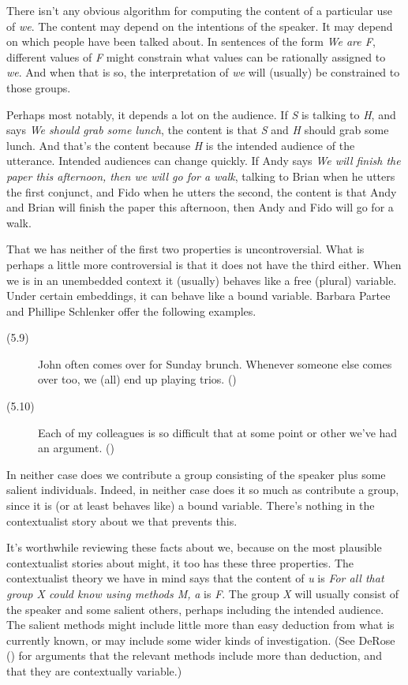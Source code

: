 \documentclass[
  10pt,
  letterpaper,
  DIV=11,
  numbers=noendperiod,
  twoside]{scrartcl}
\begin{document}
There isn't any obvious algorithm for computing the content of a
particular use of \emph{we}. The content may depend on the intentions of
the speaker. It may depend on which people have been talked about. In
sentences of the form \emph{We are F}, different values of \emph{F}
might constrain what values can be rationally assigned to \emph{we}. And
when that is so, the interpretation of \emph{we} will (usually) be
constrained to those groups.

Perhaps most notably, it depends a lot on the audience. If \emph{S} is
talking to \emph{H}, and says \emph{We should grab some lunch}, the
content is that \emph{S} and \emph{H} should grab some lunch. And that's
the content because \emph{H} is the intended audience of the utterance.
Intended audiences can change quickly. If Andy says \emph{We will finish
the paper this afternoon, then we will go for a walk}, talking to Brian
when he utters the first conjunct, and Fido when he utters the second,
the content is that Andy and Brian will finish the paper this afternoon,
then Andy and Fido will go for a walk.

That we has neither of the first two properties is uncontroversial. What
is perhaps a little more controversial is that it does not have the
third either. When we is in an unembedded context it (usually) behaves
like a free (plural) variable. Under certain embeddings, it can behave
like a bound variable. Barbara Partee and Phillipe Schlenker offer the
following examples.

\begin{description}
\item[(5.9)]
John often comes over for Sunday brunch. Whenever someone else comes
over too, we (all) end up playing trios.
()
\item[(5.10)]
Each of my colleagues is so difficult that at some point or other we've
had an argument. ()
\end{description}

In neither case does we contribute a group consisting of the speaker
plus some salient individuals. Indeed, in neither case does it so much
as contribute a group, since it is (or at least behaves like) a bound
variable. There's nothing in the contextualist story about we that
prevents this.

It's worthwhile reviewing these facts about we, because on the most
plausible contextualist stories about might, it too has these three
properties. The contextualist theory we have in mind says that the
content of \emph{u} is \emph{For all that group X could know using
methods M,} \emph{a} is \emph{F}. The group \emph{X} will usually
consist of the speaker and some salient others, perhaps including the
intended audience. The salient methods might include little more than
easy deduction from what is currently known, or may include some wider
kinds of investigation. (See DeRose ()
for arguments that the relevant methods include more than deduction, and
that they are contextually variable.)
\end{document}
